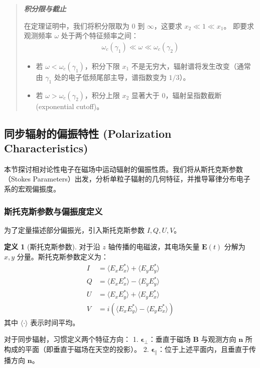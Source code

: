 \documentclass[12pt,oneside]{ctexart}
\theoremstyle{definition}
\newtheorem{definition}{定义}[section]
\theoremstyle{plain}
\theoremstyle{remark}
\newif\ifshowderiv
\newcommand{\derivdefaulttitle}{额外说明}
\newenvironment{derivationnote}[1][\derivdefaulttitle]{%
  \ifshowderiv\begin{quote}\small\itshape
  \noindent\textbf{#1}\;\par
}{%
  \end{quote}\fi
}
\begin{document}
\begin{derivationnote}[积分限与截止]
    在定理证明中，我们将积分限取为 $0$ 到 $\infty$，这要求 $x_2 \ll 1 \ll x_1$。
    即要求观测频率 $\omega$ 处于两个特征频率之间：
    \begin{align}
        \omega_c(\gamma_1) \ll \omega \ll \omega_c(\gamma_2)
    \end{align}
    \begin{itemize}
        \item 若 $\omega < \omega_c(\gamma_1)$，积分下限 $x_1$ 不是无穷大，辐射谱将发生改变（通常由 $\gamma_1$ 处的电子低频尾部主导，谱指数变为 $1/3$）。
        \item 若 $\omega > \omega_c(\gamma_2)$，积分上限 $x_2$ 显著大于 0，辐射呈指数截断 (exponential cutoff)。
    \end{itemize}
\end{derivationnote}

\subsection{同步辐射的偏振特性 (Polarization Characteristics)}

本节探讨相对论性电子在磁场中运动辐射的偏振性质。我们将从斯托克斯参数（Stokes Parameters）出发，分析单粒子辐射的几何特征，并推导幂律分布电子系的宏观偏振度。

\subsubsection{斯托克斯参数与偏振度定义}

为了定量描述部分偏振光，引入斯托克斯参数 $I, Q, U, V$。

\begin{definition}[斯托克斯参数]
对于沿 $z$ 轴传播的电磁波，其电场矢量 $\mathbf{E}(t)$ 分解为 $x, y$ 分量。斯托克斯参数定义为：
\begin{align}
    I &= \langle E_x E_x^* \rangle + \langle E_y E_y^* \rangle \\
    Q &= \langle E_x E_x^* \rangle - \langle E_y E_y^* \rangle \\
    U &= \langle E_x E_y^* \rangle + \langle E_y E_x^* \rangle \\
    V &= i (\langle E_x E_y^* \rangle - \langle E_y E_x^* \rangle)
\end{align}
其中 $\langle \cdot \rangle$ 表示时间平均。
\end{definition}

对于同步辐射，习惯定义两个特征方向：
1.  $\boldsymbol{\epsilon}_{\perp}$：垂直于磁场 $\mathbf{B}$ 与观测方向 $\mathbf{n}$ 所构成的平面（即垂直于磁场在天空的投影）。
2.  $\boldsymbol{\epsilon}_{\parallel}$：位于上述平面内，且垂直于传播方向 $\mathbf{n}$。
\end{document}
